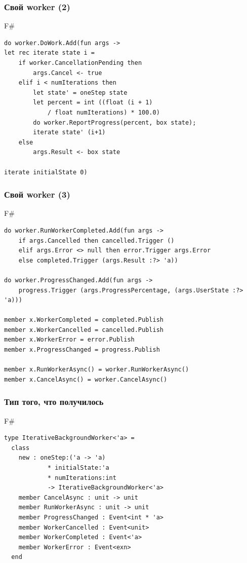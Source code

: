 \documentclass[xetex,mathserif,serif]{beamer}
\begin{document}
    \begin{frame}[fragile]
        \frametitle{Свой worker (2)}
        \begin{exampleblock}{F\#}
            \begin{lstlisting}
do worker.DoWork.Add(fun args ->
let rec iterate state i =
    if worker.CancellationPending then
        args.Cancel <- true
    elif i < numIterations then
        let state' = oneStep state
        let percent = int ((float (i + 1) 
            / float numIterations) * 100.0)
        do worker.ReportProgress(percent, box state);
        iterate state' (i+1)
    else
        args.Result <- box state

iterate initialState 0)
\end{lstlisting}
\end{exampleblock}
\end{frame}

    \begin{frame}[fragile]
        \frametitle{Свой worker (3)}
        \begin{exampleblock}{F\#}
            \begin{lstlisting}[basicstyle=\scriptsize]
do worker.RunWorkerCompleted.Add(fun args ->
    if args.Cancelled then cancelled.Trigger ()
    elif args.Error <> null then error.Trigger args.Error
    else completed.Trigger (args.Result :?> 'a))

do worker.ProgressChanged.Add(fun args ->
    progress.Trigger (args.ProgressPercentage, (args.UserState :?> 'a)))

member x.WorkerCompleted = completed.Publish
member x.WorkerCancelled = cancelled.Publish
member x.WorkerError = error.Publish
member x.ProgressChanged = progress.Publish

member x.RunWorkerAsync() = worker.RunWorkerAsync()
member x.CancelAsync() = worker.CancelAsync()
\end{lstlisting}
\end{exampleblock}
\end{frame}

    \begin{frame}[fragile]
        \frametitle{Тип того, что получилось}
        \begin{exampleblock}{F\#}
            \begin{lstlisting}
type IterativeBackgroundWorker<'a> =
  class
    new : oneStep:('a -> 'a) 
            * initialState:'a 
            * numIterations:int 
            -> IterativeBackgroundWorker<'a>
    member CancelAsync : unit -> unit
    member RunWorkerAsync : unit -> unit
    member ProgressChanged : Event<int * 'a>
    member WorkerCancelled : Event<unit>
    member WorkerCompleted : Event<'a>
    member WorkerError : Event<exn>
  end
\end{lstlisting}
\end{exampleblock}
\end{frame}
\end{document}
